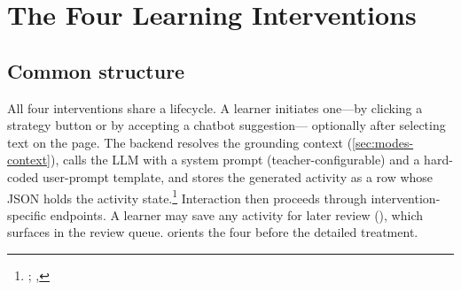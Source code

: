 \chapter{The Four Learning Interventions}
\label{ch:interventions}


\section{Common structure}
\label{sec:interventions-common}

All four interventions share a lifecycle. A learner initiates one---by
clicking a strategy button or by accepting a chatbot suggestion---
optionally after selecting text on the page. The backend resolves the
grounding context (\cref{sec:modes-context}), calls the LLM with a
system prompt (teacher-configurable) and a hard-coded user-prompt
template, and stores the generated activity as a
 row whose  JSON holds the
activity state.\footnote{;
, } Interaction
then proceeds through intervention-specific endpoints. A learner may save
any activity for later review (), which
surfaces in the review queue.  orients the
four before the detailed treatment.

